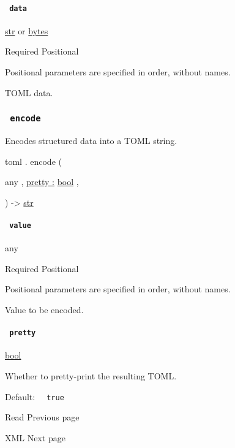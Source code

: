 \paragraph{\texorpdfstring{\texttt{\ data\ }}{ data }}\label{definitions-decode-data}

\href{/docs/reference/foundations/str/}{str} {or}
\href{/docs/reference/foundations/bytes/}{bytes}

{Required} {{ Positional }}

\label{definitions-decode-data-positional-tooltip}
Positional parameters are specified in order, without names.

TOML data.

\subsubsection{\texorpdfstring{\texttt{\ encode\ }}{ encode }}\label{definitions-encode}

Encodes structured data into a TOML string.

toml { . } { encode } (

{ { any } , } { \hyperref[definitions-encode-parameters-pretty]{pretty
:} \href{/docs/reference/foundations/bool/}{bool} , }

) -\textgreater{} \href{/docs/reference/foundations/str/}{str}

\paragraph{\texorpdfstring{\texttt{\ value\ }}{ value }}\label{definitions-encode-value}

{ any }

{Required} {{ Positional }}

\label{definitions-encode-value-positional-tooltip}
Positional parameters are specified in order, without names.

Value to be encoded.

\paragraph{\texorpdfstring{\texttt{\ pretty\ }}{ pretty }}\label{definitions-encode-pretty}

\href{/docs/reference/foundations/bool/}{bool}

Whether to pretty-print the resulting TOML.

Default: \texttt{\ }{\texttt{\ true\ }}\texttt{\ }

\href{/docs/reference/data-loading/read/}{\pandocbounded{}}

{ Read } { Previous page }

\href{/docs/reference/data-loading/xml/}{\pandocbounded{}}

{ XML } { Next page }
